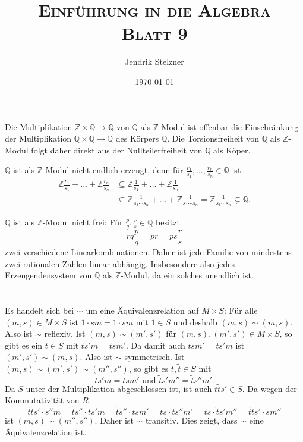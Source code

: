 \documentclass[a4paper,10pt]{article}
\title{\textsc{Einführung in die Algebra \\ \Large Blatt 9}}
\author{Jendrik Stelzner}
\date{\today}
\theoremstyle{definition}
\newcommand{\Z}{\mathbb{Z}}
\newcommand{\Q}{\mathbb{Q}}
\begin{document}
\maketitle





\section{}
Die Multiplikation $\Z \times \Q \rightarrow \Q$ von $\Q$ als $\Z$-Modul ist offenbar die Einschränkung der Multiplikation $\Q \times \Q \rightarrow \Q$ des Körpers $\Q$. Die Torsionsfreiheit von $\Q$ als $\Z$-Modul folgt daher direkt aus der Nullteilerfreiheit von $\Q$ als Köper.

$\Q$ ist als $\Z$-Modul nicht endlich erzeugt, denn für $\frac{r_1}{s_1}, \ldots, \frac{r_n}{s_n} \in \Q$ ist
\begin{align*}
 \Z \frac{r_1}{s_1} + \ldots + \Z \frac{r_n}{s_n}
 &\subseteq \Z \frac{1}{s_1} + \ldots + \Z \frac{1}{s_n} \\
 &\subseteq \Z \frac{1}{s_1 \cdots s_n} + \ldots + \Z \frac{1}{s_1 \cdots s_n} 
 = \Z \frac{1}{s_1 \cdots s_n}
 \subsetneq \Q.
\end{align*}


$\Q$ ist als $\Z$-Modul nicht frei: Für $\frac{p}{q}, \frac{r}{s} \in \Q$ besitzt
\[
 rq \frac{p}{q} = pr = ps \frac{r}{s}
\]
zwei verschiedene Linearkombinationen. Daher ist jede Familie von mindestens zwei rationalen Zahlen linear abhängig. Insbesondere also jedes Erzeugendensystem von $\Q$ als $\Z$-Modul, da ein solches unendlich ist.





\section{}


\subsection{}
Es handelt sich bei $\sim$ um eine Äquivalenzrelation auf $M \times S$: Für  alle $(m,s) \in M \times S$ ist \mbox{$1 \cdot sm = 1 \cdot sm$} mit $1 \in S$ und deshalb $(m,s) \sim (m,s)$. Also ist $\sim$ reflexiv. Ist $(m,s) \sim (m', s')$ für $(m,s), (m',s') \in M \times S$, so gibt es ein $t \in S$ mit $ts'm = tsm'$. Da damit auch $tsm' = ts'm$ ist $(m',s') \sim (m,s)$. Also ist $\sim$ symmetrisch. Ist $(m,s) \sim (m',s') \sim (m'', s'')$, so gibt es $t, \tilde{t} \in S$ mit
\[
 ts'm = tsm' \text{ und } \tilde{t}s'm'' = \tilde{t}s''m'.
\]
Da $S$ unter der Multiplikation abgeschlossen ist, ist auch $t\tilde{t}s' \in S$. Da wegen der Kommutativität von $R$
\[
 t\tilde{t}s' \cdot s''m
 = \tilde{t}s'' \cdot ts'm
 = \tilde{t}s'' \cdot tsm'
 = ts \cdot \tilde{t}s''m'
 = ts \cdot \tilde{t}s'm''
 = t\tilde{t}s' \cdot sm''
\]
ist $(m,s) \sim (m'',s'')$. Daher ist $\sim$ transitiv. Dies zeigt, dass $\sim$ eine Äquivalenzrelation ist.
\end{document}
